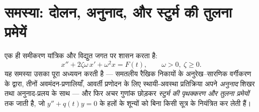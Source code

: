 \section{समस्या: दोलन, अनुनाद, और स्टुर्म की तुलना प्रमेयें}

\begin{problem}\label{pb:b2:diffeq:1}
एक ही समीकरण यांत्रिक और विद्युत जगत पर शासन करता है:
\[
x'' + 2\zeta\omega\,x' + \omega^2 x = F(t),
\qquad \omega > 0,\ \zeta \geq 0 .
\]
यह समस्या उसका पूरा अध्ययन करती है --- समतलीय रैखिक निकायों के
अनुरेख--सारणिक वर्गीकरण के द्वारा, तीनों अवमंदन-प्रणालियाँ, आवर्ती
प्रणोदन के लिए स्थायी-अवस्था प्रतिक्रिया अपने \emph{अनुनाद}
शिखर तथा अनुनाद-प्रलय के साथ --- और फिर अचर गुणांक छोड़कर \emph{स्टुर्म
की पृथक्करण और तुलना प्रमेयों} तक जाती है, जो
$y'' + q(t)y = 0$ के हलों के शून्यों को बिना किसी सूत्र के नियंत्रित कर लेती हैं।


\end{problem}
